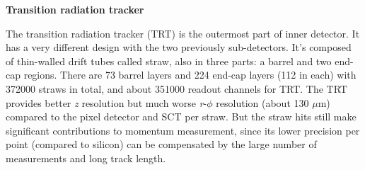 \textbf{Transition radiation tracker}

The transition radiation tracker (TRT)\cite{TRT_2008} is the outermost part of inner detector.
It has a very different design with the two previously sub-detectors. It's composed of thin-walled drift tubes called straw, also in three parts: a barrel and two end-cap regions.
There are 73 barrel layers and 224 end-cap layers (112 in each) with 372000 straws in total, and about 351000 readout channels for TRT.
The TRT provides better \textit{z} resolution but much worse \textit{r}-$\phi$ resolution (about 130 $\mu$m) compared to the pixel detector and SCT per straw.
But the straw hits still make significant contributions to momentum measurement, since its lower precision per point (compared to silicon) can be compensated by the large number of measurements and long track length.
